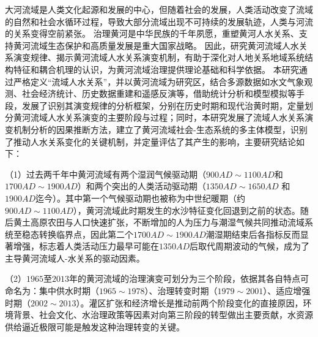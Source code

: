\begin{cabstract}



大河流域是人类文化起源和发展的中心，但随着社会的发展，人类活动改变了流域的自然和社会水循环过程，导致大部分流域出现不可持续的发展轨迹，人类与河流的关系变得空前紧张。
治理黄河是中华民族的千年夙愿，重塑黄河人水关系、支持黄河流域生态保护和高质量发展是重大国家战略。
因此，研究黄河流域人水关系演变规律、揭示黄河流域人水关系演变机制，有助于深化对人地关系地域系统结构特征和耦合机理的认识，为黄河流域治理提供理论基础和科学依据。
本研究通过严格定义“流域人水关系”，并以黄河流域为研究区，结合多源数据如水文气象观测、社会经济统计、历史数据重建和遥感反演等，借助统计分析和模型模拟等手段，发展了识别其演变规律的分析框架，分别在历史时期和现代治黄时期，定量划分黄河流域人水关系演变的主要阶段与过程；同时，本研究发展了流域人水关系演变机制分析的因果推断方法，建立了黄河流域社会-生态系统的多主体模型，识别了推动人水关系变化的关键机制，并定量评估了其产生的影响，主要研究结论如下：

（1）过去两千年中黄河流域有两个湿润气候驱动期（$900AD\sim1100AD$和$1700AD\sim1900AD$）和两个突出的人类活动驱动期（$1350AD \sim 1650AD$ 和 $1900AD$迄今）。其中第一个气候驱动期也被称为中世纪暖期（约$900AD \sim 1100AD$），黄河流域此时期发生的水沙特征变化回退到之前的状态。随后黄土高原农田与人口快速扩张，不断增加的人为压力与潮湿气候共同推动流域系统至稳态转换临界点，因此第二个$1700AD \sim 1900AD$潮湿期结束后各指标反而显著增强，标志着人类活动压力最早可能在$1350AD$后取代周期波动的气候，成为了主导黄河流域人-水关系的驱动因素。

（2）$1965$至$2013$年的黄河流域的治理演变可划分为三个阶段，依据其各自特点可命名为：集中供水时期（$1965 \sim 1978$）、治理转变时期（$1979 \sim 2001$）、适应增强时期（$2002 \sim 2013$）。灌区扩张和经济增长是推动前两个阶段变化的直接原因，环境背景、社会文化、水治理政策等因素对向第三阶段的转型做出主要贡献，水资源供给逼近极限可能是触发这种治理转变的关键。


\end{cabstract}
